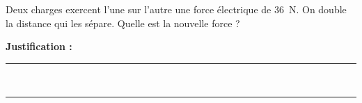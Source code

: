 Deux charges exercent l'une sur l'autre une force électrique de \qty{36}{N}. On double la distance qui les sépare. Quelle est la nouvelle force ?

\choices

\noindent\textbf{Justification :} \hrulefill \\[2.5ex]
\rule{\linewidth}{0.4pt} \\[2.5ex]
\rule{\linewidth}{0.4pt}
\vfill
